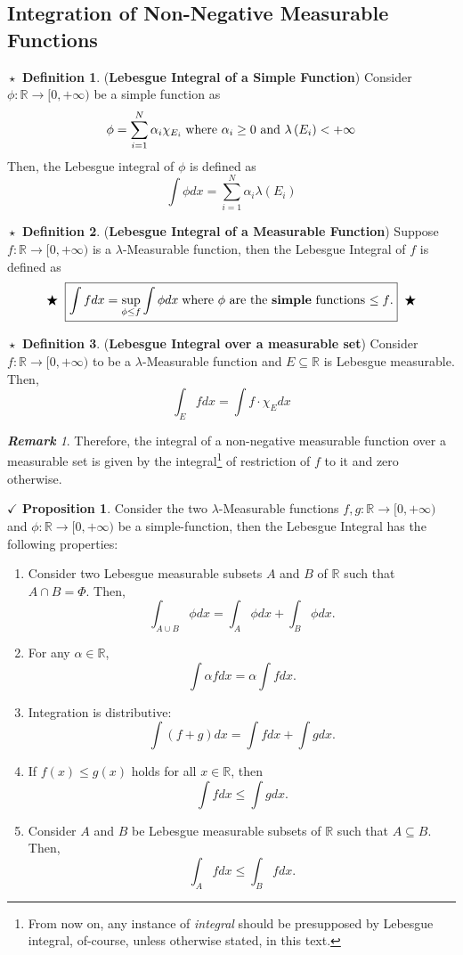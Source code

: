 \documentclass{article}
\theoremstyle{definition}
\newtheorem{definition}{$\boxed{\star}$ Definition}
\theoremstyle{remark}
\newtheorem*{remark}{\textbf{Remark}}
\theoremstyle{definition}
\theoremstyle{definition}
\newtheorem{proposition}{$\checkmark$ Proposition}
\theoremstyle{definition}
\newcommand{\union}{\cup}
\newcommand{\intrs}{\cap}
\newcommand{\R}{\mathbb{R}}
\newcommand{\lm}[1]{\lambda\left (#1\right )}
\begin{document}
 \subsection{Integration of Non-Negative Measurable Functions}
 \begin{definition}
 	(\textbf{Lebesgue Integral of a Simple Function}) Consider $ \phi: \R \to [0,+\infty) $ be a simple function as
 	\[\phi = \sum_{i=1}^{N} \alpha_i \chi_{E_i}\;\text{where $ \alpha_i \ge 0 $ and $ \lm{E_i} < +\infty $}\]
 	Then, the Lebesgue integral of $ \phi $ is defined as
 	\[\int \phi dx = \sum_{i=1}^{N}\alpha_i \lm{E_i}\]
 \end{definition}
\hrulefill

\begin{definition}
	(\textbf{Lebesgue Integral of a Measurable Function}) Suppose $ f : \R\to [0,+\infty) $ is a $ \lambda $-Measurable function, then the Lebesgue Integral of $ f $ is defined as
	\begin{equation*}
		\begin{split}
		\bigstar\;\;	\boxed{\int f dx = \sup_{\phi\le f} \int \phi dx\;\text{where $ \phi $ are the \textbf{simple} functions $ \le f $.}}\;\; \bigstar
		\end{split}
	\end{equation*}
\end{definition}
\hrulefill
\begin{definition}
	(\textbf{Lebesgue Integral over a measurable set}) Consider $ f : \R \to [0,+\infty) $ to be a $ \lambda $-Measurable function and $ E\subseteq \R $ is Lebesgue measurable. Then,
	\[\int_E f dx = \int f \cdot\chi_E dx\]
\end{definition}
\begin{remark}
	Therefore, the integral of a non-negative measurable function over a measurable set is given by the integral\footnote{From now on, any instance of \emph{integral} should be presupposed by Lebesgue integral, of-course, unless otherwise stated, in this text.} of restriction of $ f $ to it and zero otherwise.
\end{remark}
\hrulefill
\begin{proposition}
	Consider the two $ \lambda $-Measurable functions $ f,g : \R \to [0,+\infty) $ and $ \phi: \R \to [0,+\infty) $ be a simple-function, then the Lebesgue Integral has the following properties:
	\begin{enumerate}
		\item {Consider two Lebesgue measurable subsets $ A $ and $ B $ of $ \R $ such that $ A\intrs B = \Phi $. Then,
	\[\int_{A\union B}\phi dx = \int_A \phi dx + \int_B \phi dx.\]	
	}
		\item {For any $ \alpha \in \R $,
	\[\int \alpha fdx = \alpha \int fdx.\]	
	}
\item {Integration is distributive:
\[\int (f+g)dx = \int fdx + \int gdx.\]
}
\item {If $ f(x) \le g(x) $ holds for all $ x\in \R $, then 
\[\int fdx \le \int gdx.\]
}
\item {Consider $ A $ and $ B $ be Lebesgue measurable subsets of $ \R $ such that $ A\subseteq B $. Then,
\[\int_A f dx \le \int_B fdx.\]
}
	\end{enumerate}
\end{proposition}
\end{document}
